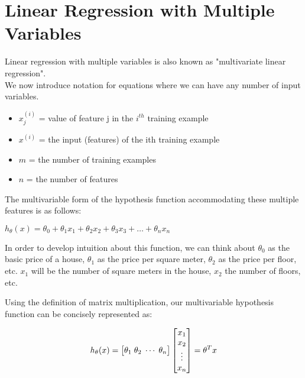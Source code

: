 \chapter{Linear Regression with Multiple Variables}

Linear regression with multiple variables is also known as "multivariate linear regression".\\

We now introduce notation for equations where we can have any number of input variables.

\begin{itemize}
\item $ x^{(i)}_j $ = value of feature j in the $ i^{th} $ training example
\item $ x^{(i)} $ = the input (features) of the ith training example
\item $ m $ = the number of training examples
\item $ n $ = the number of features
\end{itemize}

The multivariable form of the hypothesis function accommodating these multiple features is as follows:\\

\begin{center}
$h_\theta(x) = \theta_0+\theta_1x_1+\theta_2x_2+\theta_3x_3+ \dots +\theta_nx_n$
\end{center}

In order to develop intuition about this function, we can think about $ \theta_0 $ as the basic price of a house, $ \theta_1 $ as the price per square meter, $ \theta_2 $ as the price per floor, etc. $ x_1 $ will be the number of square meters in the house, $ x_2 $ the number of floors, etc.

Using the definition of matrix multiplication, our multivariable hypothesis function can be concisely represented as:

\begin{align}
h_\theta(x) = \begin{bmatrix}
\theta_{1} \hspace{0.1cm}
\theta_{2} \hspace{0.1cm}
\cdots \hspace{0.1cm}
\theta_{n}
\end{bmatrix}
\begin{bmatrix}
x_{1} \\
x_{2} \\
\vdots \\
x_{n}
\end{bmatrix} = \theta^Tx
\end{align}

